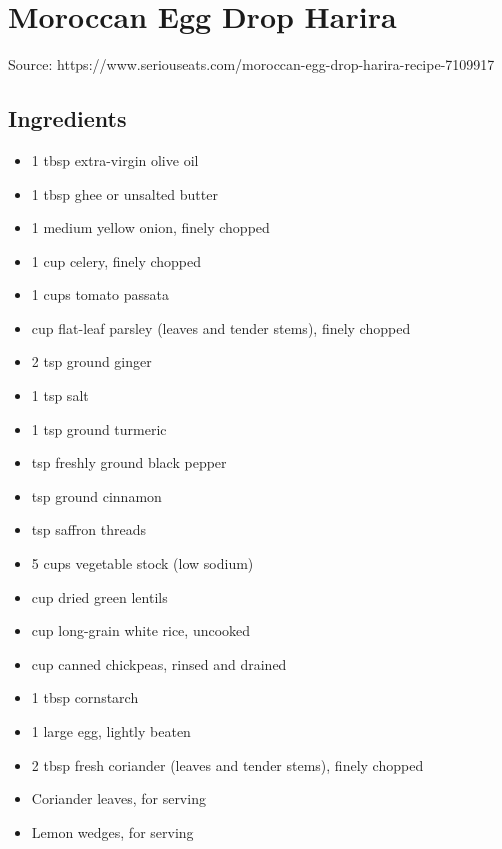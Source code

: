\clearpage
\section{Moroccan Egg Drop Harira}


Source: https://www.seriouseats.com/moroccan-egg-drop-harira-recipe-7109917

\subsection{Ingredients}

\begin{itemize}
    \item 1 tbsp extra-virgin olive oil
    \item 1 tbsp ghee or unsalted butter
    \item 1 medium yellow onion, finely chopped
    \item 1 cup celery, finely chopped
    \item 1 cups tomato passata
    \item {} cup flat-leaf parsley (leaves and tender stems), finely chopped
    \item 2 tsp ground ginger
    \item 1 tsp salt
    \item 1 tsp ground turmeric
    \item {} tsp freshly ground black pepper
    \item {} tsp ground cinnamon
    \item {} tsp saffron threads
    \item 5 cups vegetable stock (low sodium)
    \item {} cup dried green lentils
    \item {} cup long-grain white rice, uncooked
    \item {} cup canned chickpeas, rinsed and drained
    \item 1 tbsp cornstarch
    \item 1 large egg, lightly beaten
    \item 2 tbsp fresh coriander (leaves and tender stems), finely chopped
    \item Coriander leaves, for serving
    \item Lemon wedges, for serving
\end{itemize}

